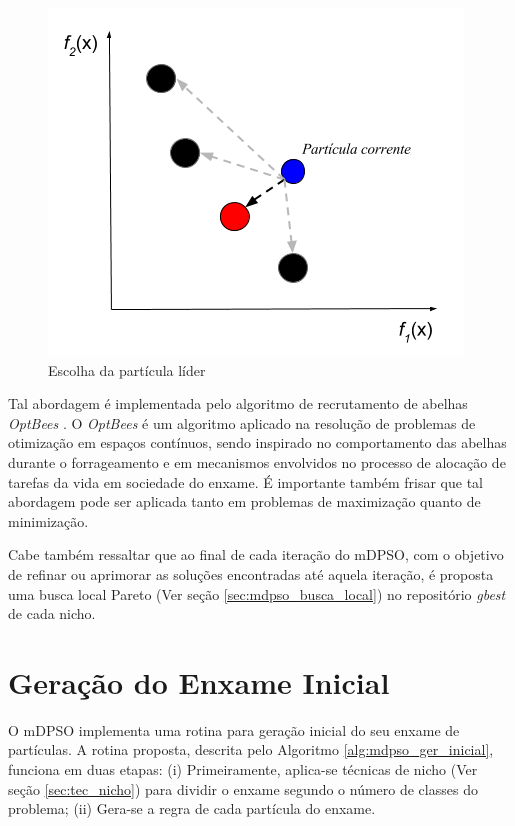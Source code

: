\documentclass[
	12pt,				%
	openany,			%
	oneside,	
	a4paper,			%
	brazil,				%
	]{unimontes-ppgmsc-abntex2}
\begin{document}
\begin{figure}[ht]
\centering
\includegraphics[scale=.5]{img/best}
\caption{Escolha da partícula líder}
\label{fig:sel_lider}
\end{figure}

Tal abordagem é implementada pelo algoritmo de recrutamento de abelhas {\em OptBees} \cite{Renato_2012}. O {\em OptBees} é um algoritmo aplicado na resolução de problemas de otimização em espaços contínuos, sendo inspirado no comportamento das abelhas durante o forrageamento e em mecanismos envolvidos no processo de alocação de tarefas da vida em sociedade do enxame. É importante também frisar que tal abordagem pode ser aplicada tanto em problemas de maximização quanto de minimização.

Cabe também ressaltar que ao final de cada iteração do mDPSO, com o objetivo de refinar ou aprimorar as soluções encontradas até aquela iteração, é proposta uma busca local Pareto (Ver seção \ref{sec:mdpso_busca_local}) no repositório {\em gbest} de cada nicho.

\section{Geração do Enxame Inicial}
\label{sec:mdpso_ger_inicial}

O mDPSO implementa uma rotina para geração inicial do seu enxame de partículas. A rotina proposta, descrita pelo Algoritmo \ref{alg:mdpso_ger_inicial}, funciona em duas etapas: (i) Primeiramente, aplica-se técnicas de nicho (Ver seção \ref{sec:tec_nicho}) para dividir o enxame segundo o número de classes do problema; (ii) Gera-se a regra de cada partícula do enxame. 
\end{document}
